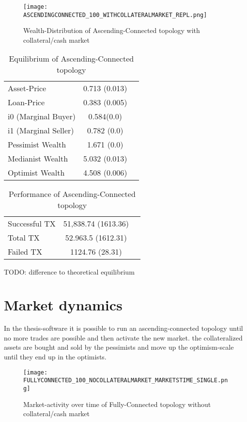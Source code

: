 \documentclass[Bachelorarbeit.tex]{subfiles}
\begin{document}
\begin{figure}[H]
	\centering
  \texttt{[image: ASCENDINGCONNECTED\_100\_WITHCOLLATERALMARKET\_REPL.png]}
	\caption{Wealth-Distribution of Ascending-Connected topology with collateral/cash market}
	\label{fig:wealth_ASCENDINGCONNECTED_100_WITHCOLLATERALMARKET_REPL}
\end{figure}

\begin{table}[h]
	\caption{Equilibrium of Ascending-Connected topology}
	\centering
	\begin{tabular} { l c r }
		\hline
		Asset-Price & 0.713 (0.013) \\
		Loan-Price & 0.383 (0.005) \\
		i0 (Marginal Buyer) & 0.584(0.0) \\
		i1 (Marginal Seller) & 0.782 (0.0) \\
		Pessimist Wealth & 1.671 (0.0) \\
		Medianist Wealth & 5.032 (0.013) \\
		Optimist Wealth & 4.508 (0.006) \\
		\hline
	\end{tabular}
\end{table} 

\begin{table}[h]
	\caption{Performance of Ascending-Connected topology}
	\centering
	\begin{tabular} { l c r }
		\hline
		Successful TX & 51,838.74 (1613.36) \\
		Total TX & 52.963.5 (1612.31) \\
		Failed TX & 1124.76 (28.31) \\
		\hline
	\end{tabular}
\end{table}

TODO: difference to theoretical equilibrium

\section{Market dynamics}
In the thesis-software it is possible to run an ascending-connected topology until no more trades are possible and then activate the new market. the collateralized assets are bought and sold by the pessimists and move up the optimism-scale until they end up in the optimists.

\begin{figure}[H]
	\centering
  \texttt{[image: FULLYCONNECTED\_100\_NOCOLLATERALMARKET\_MARKETSTIME\_SINGLE.png]}
  	\caption{Market-activity over time of Fully-Connected topology without collateral/cash market}
	\label{fig:wealth_FULLYCONNECTED_100_WITHCOLLATERALMARKET_MARKETSTIME_REPL}
\end{figure}
\end{document}
